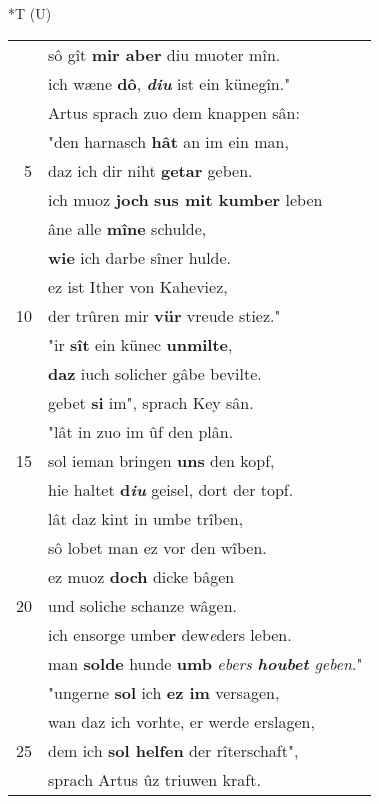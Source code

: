 \documentclass[8pt,a4paper,notitlepage]{article}
\begin{document}
\begin{table}[ht]
\begin{minipage}[t]{0.5\linewidth}
\end{minipage}
\hspace{0.5cm}
\begin{minipage}[t]{0.5\linewidth}
\small
\begin{center}*T (U)
\end{center}
\begin{tabular}{rl}
 & sô gît \textbf{mir aber} diu muoter mîn.\\ 
 & ich wæne \textbf{dô}, \textit{\textbf{diu}} ist ein künegîn."\\ 
 & Artus sprach zuo dem knappen sân:\\ 
 & "den harnasch \textbf{hât} an im ein man,\\ 
5 & daz ich dir niht \textbf{getar} geben.\\ 
 & ich muoz \textbf{joch} \textbf{sus mit kumber} leben\\ 
 & âne alle \textbf{mîne} schulde,\\ 
 & \textbf{wie} ich darbe sîner hulde.\\ 
 & ez ist Ither von Kaheviez,\\ 
10 & der trûren mir \textbf{vür} vreude stiez."\\ 
 & "ir \textbf{sît} ein künec \textbf{unmilte},\\ 
 & \textbf{daz} iuch solicher gâbe bevilte.\\ 
 & gebet \textbf{si} im", sprach Key sân.\\ 
 & "lât in zuo im ûf den plân.\\ 
15 & sol ieman bringen \textbf{uns} den kopf,\\ 
 & hie haltet \textbf{d\textit{iu}} geisel, dort der topf.\\ 
 & lât daz kint in umbe trîben,\\ 
 & sô lobet man ez vor den wîben.\\ 
 & ez muoz \textbf{doch} dicke bâgen\\ 
20 & und soliche schanze wâgen.\\ 
 & ich ensorge umbe\textbf{r} dew\textit{e}ders leben.\\ 
 & man \textbf{solde} hunde \textbf{umb} \textit{ebers \textbf{houbet} geben}."\\ 
 & "ungerne \textbf{sol} ich \textbf{ez im} versagen,\\ 
 & wan daz ich vorhte, er werde erslagen,\\ 
25 & dem ich \textbf{sol helfen} der rîterschaft",\\ 
 & sprach Artus ûz triuwen kraft.\\ 

\end{tabular}
\end{minipage}
\end{table}
\end{document}
